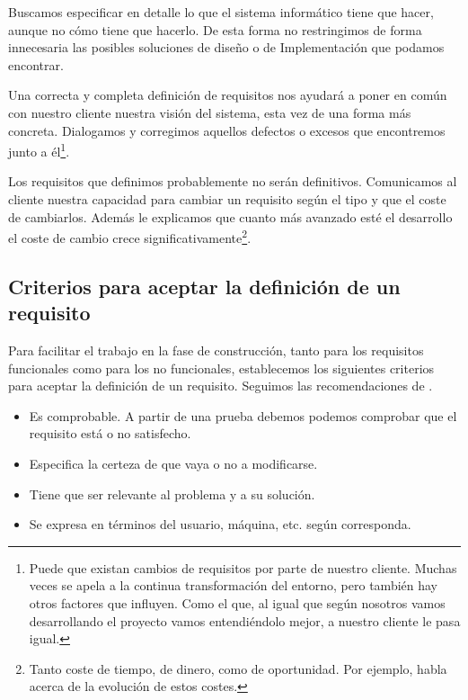 Buscamos especificar en detalle lo que el sistema informático tiene que hacer, aunque no
cómo tiene que hacerlo. De esta forma no restringimos de forma innecesaria
las posibles soluciones de diseño o de Implementación que podamos encontrar.

Una correcta y completa definición de requisitos nos ayudará a poner en común con nuestro
cliente nuestra visión del sistema, esta vez de una forma más concreta. Dialogamos y corregimos
aquellos defectos o excesos que encontremos junto a él\footnote{%
    Puede que existan cambios de requisitos por parte de nuestro cliente. Muchas veces se
    apela a la continua transformación del entorno, pero también hay otros factores que influyen.
    Como el que, al igual que según nosotros vamos desarrollando el proyecto vamos entendiéndolo
    mejor, a nuestro cliente le pasa igual.
}.

Los requisitos que definimos probablemente no serán definitivos. Comunicamos al cliente nuestra
capacidad para cambiar un requisito según el tipo y que el coste de cambiarlos. Además le
explicamos que cuanto más avanzado esté el desarrollo el coste de cambio crece significativamente\footnote{%
Tanto coste de tiempo, de dinero, como de oportunidad. Por ejemplo, \cite{CodeComplete2} habla
acerca de la evolución de estos costes.%
}.

\subsection{Criterios para aceptar la definición de un requisito}

Para facilitar el trabajo en la fase de construcción, tanto para los requisitos
funcionales como para los no funcionales, establecemos los siguientes criterios
para aceptar la definición de un requisito. Seguimos las recomendaciones de
\cite[Checklist: Requirements]{CodeComplete2}.

\begin{itemize}[noitemsep,nolistsep]
    \item Es comprobable. A partir de una prueba debemos podemos comprobar
          que el requisito está o no satisfecho.
    \item Especifica la certeza de que vaya o no a modificarse.
    \item Tiene que ser relevante al problema y a su solución.
    \item Se expresa en términos del usuario, máquina, etc. según corresponda.
\end{itemize}

